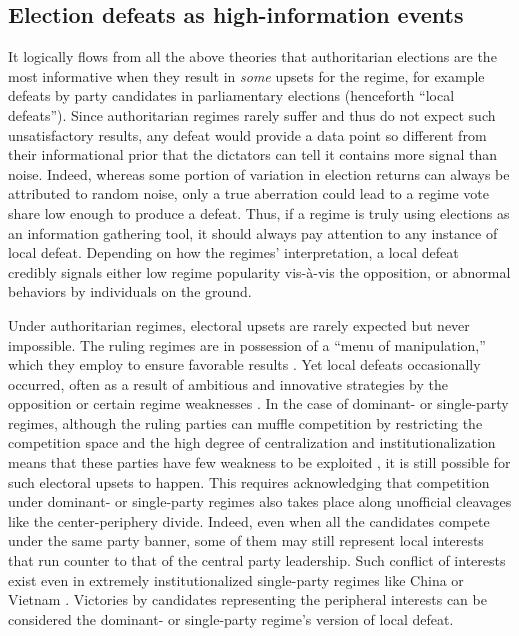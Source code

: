 \documentclass[12pt]{article}\usepackage[]{graphicx}\usepackage[]{color}
\newcommand{\1}{\mathbbm{1}}
\begin{document}
\subsection{Election defeats as high-information events}
It logically flows from all the above theories that authoritarian elections are the most informative when they result in \textit{some} upsets for the regime, for example defeats by party candidates in parliamentary elections (henceforth ``local defeats''). Since authoritarian regimes rarely suffer and thus do not expect such unsatisfactory results, any defeat would provide a data point so different from their informational prior that the dictators can tell it contains more signal than noise. Indeed, whereas some portion of variation in election returns can always be attributed to random noise, only a true aberration could lead to a regime vote share low enough to produce a defeat. Thus, if a regime is truly using elections as an information gathering tool, it should always pay attention to any instance of local defeat. Depending on how the regimes' interpretation, a local defeat credibly signals either low regime popularity vis-\`{a}-vis the opposition, or abnormal behaviors by individuals on the ground.

Under authoritarian regimes, electoral upsets are rarely expected but never impossible. The ruling regimes are in possession of a ``menu of manipulation,'' which they employ to ensure favorable results \citep{Schedler2002Menu}. Yet local defeats occasionally occurred, often as a result of ambitious and innovative strategies by the opposition \citep{BunceWolchik2010} or certain regime weaknesses \citep{LevistkyWay2010}. In the case of dominant- or single-party regimes, although the ruling parties can muffle competition by restricting the competition space \citep{Schedler2002} and the high degree of centralization and institutionalization means that these parties have few weakness to be exploited \citep{BunceWolchik2010}, it is still possible for such electoral upsets to happen. This requires acknowledging that competition under dominant- or single-party regimes also takes place along unofficial cleavages like the center-periphery divide. Indeed, even when all the candidates compete under the same party banner, some of them may still represent local interests that run counter to that of the central party leadership. Such conflict of interests exist even in extremely institutionalized single-party regimes like China \citep{Manion2014} or Vietnam \citep{MaleskySchuler2011}. Victories by candidates representing the peripheral interests can be considered the dominant- or single-party regime's version of local defeat.
\end{document}
